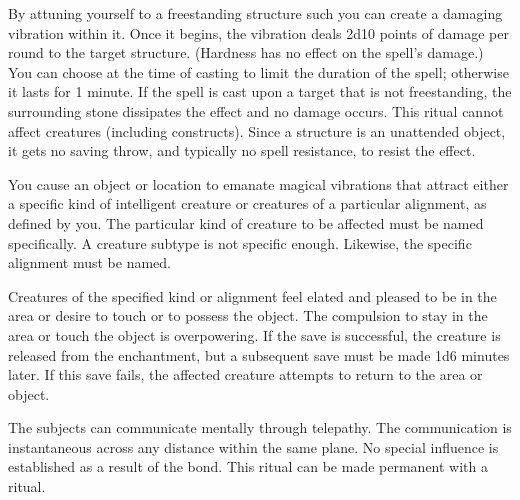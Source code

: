 \spelleffect By attuning yourself to a freestanding structure such you can create a damaging vibration within it. Once it begins, the vibration deals 2d10 points of damage per round to the target structure. (Hardness has no effect on the spell's damage.) You can choose at the time of casting to limit the duration of the spell; otherwise it lasts for 1 minute. If the spell is cast upon a target that is not freestanding, the surrounding stone dissipates the effect and no damage occurs.
\spellnotes This ritual cannot affect creatures (including constructs). Since a structure is an unattended object, it gets no saving throw, and typically no spell resistance, to resist the effect.

\spelleffect You cause an object or location to emanate magical vibrations that attract either a specific kind of intelligent creature or creatures of a particular alignment, as defined by you. The particular kind of creature to be affected must be named specifically. A creature subtype is not specific enough. Likewise, the specific alignment must be named.
\par Creatures of the specified kind or alignment feel elated and pleased to be in the area or desire to touch or to possess the object. The compulsion to stay in the area or touch the object is overpowering. If the save is successful, the creature is released from the enchantment, but a subsequent save must be made 1d6 minutes later. If this save fails, the affected creature attempts to return to the area or object.

\spelldur{\durext \dismissable}
\spelleffect The subjects can communicate mentally through telepathy. The communication is instantaneous across any distance within the same plane.
\spellnotes No special influence is established as a result of the bond. This ritual can be made permanent with a  ritual.


